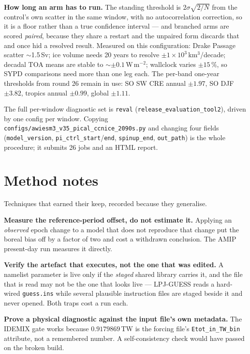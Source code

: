 \documentclass[10pt]{article}
\begin{document}
\textbf{How long an arm has to run.} The standing threshold is $2\sigma\sqrt{2/N}$ from the
control's own scatter in the same window, with no autocorrelation correction, so it is a
floor rather than a true confidence interval --- and branched arms are scored
\emph{paired}, because they share a restart and the unpaired form discards that and once
hid a resolved result. Measured on this configuration: Drake Passage scatter $\sim$1.5\,Sv;
ice volume needs 20 years to resolve $\pm1\times10^3$\,km$^3$/decade; decadal TOA means are
stable to $\sim\pm0.1$\,W\,m$^{-2}$; wallclock varies $\pm15\,\%$, so SYPD comparisons need
more than one leg each. The per-band one-year thresholds from round 26 remain in use:
SO SW CRE annual $\pm1.97$, SO DJF $\pm3.82$, tropics annual $\pm0.99$, global $\pm1.11$.

The full per-window diagnostic set is \texttt{reval}
(\texttt{release\_evaluation\_tool2}), driven by one config per window. Copying
\texttt{configs/awiesm3\_v35\_pical\_ccnice\_2090s.py} and changing four fields
(\texttt{model\_version}, \texttt{pi\_ctrl\_start}/\texttt{end}, \texttt{spinup\_end},
\texttt{out\_path}) is the whole procedure; it submits 26 jobs and an HTML report.

\section{Method notes}\label{sec:method}

Techniques that earned their keep, recorded because they generalise.

\textbf{Measure the reference-period offset, do not estimate it.} Applying an
\emph{observed} epoch change to a model that does not reproduce that change put the boreal
bias off by a factor of two and cost a withdrawn conclusion. The AMIP present-day run
measures it directly.

\textbf{Verify the artefact that executes, not the one that was edited.} A namelist
parameter is live only if the \emph{staged} shared library carries it, and the file that is
read may not be the one that looks live --- LPJ-GUESS reads a hard-wired \texttt{guess.ins}
while several plausible instruction files are staged beside it and never opened. Both traps
cost a run each.

\textbf{Prove a physical diagnostic against the input file's own metadata.} The IDEMIX gate
works because $0.9179869$\,TW is the forcing file's \texttt{Etot\_in\_TW\_bin} attribute,
not a remembered number. A self-consistency check would have passed on the broken build.
\end{document}
